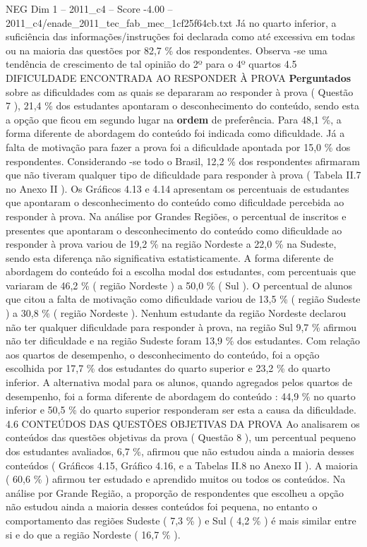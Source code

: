 \begin{textsample}{NEG Dim 1 – 2011\_c4 – Score -4.00 – 2011\_c4/enade\_2011\_tec\_fab\_mec\_1cf25f64cb.txt}
Já no quarto inferior, a suficiência das informações/instruções foi declarada como até excessiva em todas ou na maioria das questões por 82,7 \% dos respondentes.
Observa -se uma tendência de crescimento de tal opinião do 2º para o 4º quartos 4.5 DIFICULDADE ENCONTRADA AO RESPONDER À PROVA \textbf{Perguntados} sobre as dificuldades com as quais se depararam ao responder à prova ( Questão 7 ), 21,4 \% dos estudantes apontaram o desconhecimento do conteúdo, sendo esta a opção que ficou em segundo lugar na \textbf{ordem} de preferência.
Para 48,1 \%, a forma diferente de abordagem do conteúdo foi indicada como dificuldade.
Já a falta de motivação para fazer a prova foi a dificuldade apontada por 15,0 \% dos respondentes.
Considerando -se todo o Brasil, 12,2 \% dos respondentes afirmaram que não tiveram qualquer tipo de dificuldade para responder à prova ( Tabela II.7 no Anexo II ).
Os Gráficos 4.13 e 4.14 apresentam os percentuais de estudantes que apontaram o desconhecimento do conteúdo como dificuldade percebida ao responder à prova.
Na análise por Grandes Regiões, o percentual de inscritos e presentes que apontaram o desconhecimento do conteúdo como dificuldade ao responder à prova variou de 19,2 \% na região Nordeste a 22,0 \% na Sudeste, sendo esta diferença não significativa estatisticamente.
A forma diferente de abordagem do conteúdo foi a escolha modal dos estudantes, com percentuais que variaram de 46,2 \% ( região Nordeste ) a 50,0 \% ( Sul ).
O percentual de alunos que citou a falta de motivação como dificuldade variou de 13,5 \% ( região Sudeste ) a 30,8 \% ( região Nordeste ).
Nenhum estudante da região Nordeste declarou não ter qualquer dificuldade para responder à prova, na região Sul 9,7 \% afirmou não ter dificuldade e na região Sudeste foram 13,9 \% dos estudantes.
Com relação aos quartos de desempenho, o desconhecimento do conteúdo, foi a opção escolhida por 17,7 \% dos estudantes do quarto superior e 23,2 \% do quarto inferior.
A alternativa modal para os alunos, quando agregados pelos quartos de desempenho, foi a forma diferente de abordagem do conteúdo : 44,9 \% no quarto inferior e 50,5 \% do quarto superior responderam ser esta a causa da dificuldade. 4.6 CONTEÚDOS DAS QUESTÕES OBJETIVAS DA PROVA Ao analisarem os conteúdos das questões objetivas da prova ( Questão 8 ), um percentual pequeno dos estudantes avaliados, 6,7 \%, afirmou que não estudou ainda a maioria desses conteúdos ( Gráficos 4.15, Gráfico 4.16, e a Tabelas II.8 no Anexo II ).
A maioria ( 60,6 \% ) afirmou ter estudado e aprendido muitos ou todos os conteúdos.
Na análise por Grande Região, a proporção de respondentes que escolheu a opção não estudou ainda a maioria desses conteúdos foi pequena, no entanto o comportamento das regiões Sudeste ( 7,3 \% ) e Sul ( 4,2 \% ) é mais similar entre si e do que a região Nordeste ( 16,7 \% ).

\end{textsample}
